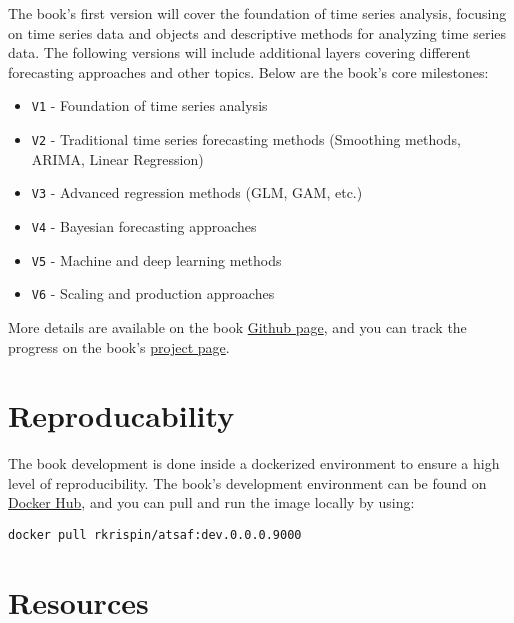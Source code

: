 \documentclass[
  letterpaper,
  DIV=11,
  numbers=noendperiod]{scrreprt}
\providecommand{\tightlist}{%
  \setlength{\itemsep}{0pt}\setlength{\parskip}{0pt}}\usepackage{longtable,booktabs,array}
\begin{document}
The book's first version will cover the foundation of time series
analysis, focusing on time series data and objects and descriptive
methods for analyzing time series data. The following versions will
include additional layers covering different forecasting approaches and
other topics. Below are the book's core milestones:

\begin{itemize}
\tightlist
\item
  \texttt{V1} - Foundation of time series analysis
\item
  \texttt{V2} - Traditional time series forecasting methods (Smoothing
  methods, ARIMA, Linear Regression)
\item
  \texttt{V3} - Advanced regression methods (GLM, GAM, etc.)
\item
  \texttt{V4} - Bayesian forecasting approaches
\item
  \texttt{V5} - Machine and deep learning methods
\item
  \texttt{V6} - Scaling and production approaches
\end{itemize}

More details are available on the book
\href{https://github.com/RamiKrispin/atsaf\#table-of-contents}{Github
page}, and you can track the progress on the book's
\href{https://github.com/users/RamiKrispin/projects/4}{project page}.

\hypertarget{reproducability}{%
\section*{Reproducability}\label{reproducability}}

The book development is done inside a dockerized environment to ensure a
high level of reproducibility. The book's development environment can be
found on
\href{https://hub.docker.com/repository/docker/rkrispin/atsaf}{Docker
Hub}, and you can pull and run the image locally by using:

\begin{verbatim}
docker pull rkrispin/atsaf:dev.0.0.0.9000
\end{verbatim}

\hypertarget{resources}{%
\section*{Resources}\label{resources}}
\end{document}
